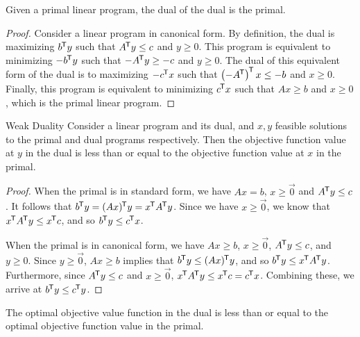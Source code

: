 \begin{prop}
    Given a primal linear program, the dual of the dual is the primal.
\end{prop} 

\begin{proof}
    Consider a linear program in canonical form.  By definition, the dual is maximizing $b^{\mkern-1.5mu\mathsf{T}}y$ such that $A^{\mkern-1.5mu\mathsf{T}}y \leq c$ and $y \geq 0$. This program is equivalent to minimizing $-b^{\mkern-1.5mu\mathsf{T}}y$ such that $-A^{\mkern-1.5mu\mathsf{T}}y \geq -c$ and $y \geq 0$. The dual of this equivalent form of the dual is to maximizing $-c^{\mkern-1.5mu\mathsf{T}}x$ such that $\left(-A^{\mkern-1.5mu\mathsf{T}}\right)^{\mkern-1.5mu\mathsf{T}}x \leq -b$ and $x \geq 0$. Finally, this program is equivalent to minimizing $c^{\mkern-1.5mu\mathsf{T}}x$ such that $Ax \geq b$ and $x \geq 0$, which is the primal linear program.
\end{proof}

\begin{thm}{Weak Duality}\label{weak-duality}\proofbreak
    Consider a linear program and its dual, and $x, y$ feasible solutions to the primal and dual programs respectively. Then the objective function value at $y$ in the dual is less than or equal to the objective function value at $x$ in the primal.
\end{thm}

\begin{proof}
    When the primal is in standard form, we have $Ax = b$, $x \geq \vec{0}$ and $A^{\mkern-1.5mu\mathsf{T}}y \leq c$. It follows that $b^{\mkern-1.5mu\mathsf{T}}y = (Ax)^{\mkern-1.5mu\mathsf{T}}y = x^{\mkern-1.5mu\mathsf{T}}A^{\mkern-1.5mu\mathsf{T}}y$. Since we have $x \geq \vec{0}$, we know that $x^{\mkern-1.5mu\mathsf{T}}A^{\mkern-1.5mu\mathsf{T}}y \leq x^{\mkern-1.5mu\mathsf{T}}c$, and so $b^{\mkern-1.5mu\mathsf{T}}y \leq c^{\mkern-1.5mu\mathsf{T}}x$.

    When the primal is in canonical form, we have $Ax \geq b$, $x \geq \vec{0}$, $A^{\mkern-1.5mu\mathsf{T}}y \leq c$, and $y \geq 0$. Since $y \geq \vec{0}$, $Ax \geq b$ implies that $b^{\mkern-1.5mu\mathsf{T}}y \leq (Ax)^{\mkern-1.5mu\mathsf{T}}y$, and so $b^{\mkern-1.5mu\mathsf{T}}y \leq x^{\mkern-1.5mu\mathsf{T}}A^{\mkern-1.5mu\mathsf{T}}y$. Furthermore, since $A^{\mkern-1.5mu\mathsf{T}}y \leq c$ and $x \geq \vec{0}$, $x^{\mkern-1.5mu\mathsf{T}}A^{\mkern-1.5mu\mathsf{T}}y \leq x^{\mkern-1.5mu\mathsf{T}}c = c^{\mkern-1.5mu\mathsf{T}}x$. Combining these, we arrive at $b^{\mkern-1.5mu\mathsf{T}}y \leq c^{\mkern-1.5mu\mathsf{T}}y$.
\end{proof}

\begin{cor}
    The optimal objective value function in the dual is less than or equal to the optimal objective function value in the primal.
\end{cor}

